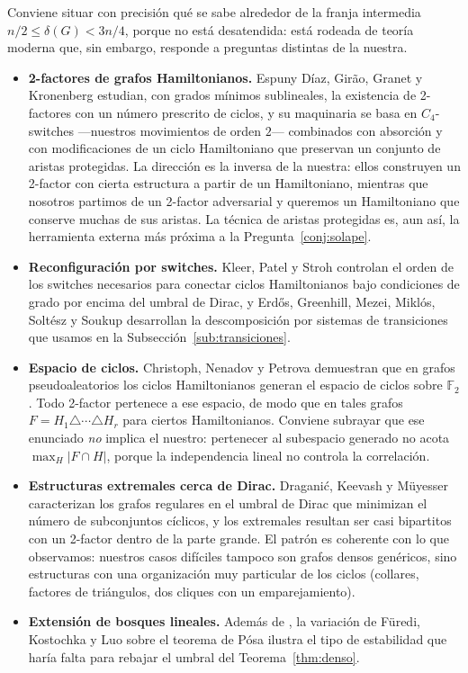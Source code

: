 \documentclass[11pt,a4paper]{article}
\theoremstyle{definition}
\theoremstyle{remark}
\begin{document}
Conviene situar con precisión qué se sabe alrededor de la franja intermedia $n/2\le\delta(G)<3n/4$, porque no está desatendida: está rodeada de teoría moderna que, sin embargo, responde a preguntas distintas de la nuestra.

\begin{itemize}
\item \textbf{2-factores de grafos Hamiltonianos.} Espuny Díaz, Girão, Granet y Kronenberg \cite{twofactors} estudian, con grados mínimos sublineales, la existencia de 2-factores con un número prescrito de ciclos, y su maquinaria se basa en $C_4$-switches —nuestros movimientos de orden $2$— combinados con absorción y con modificaciones de un ciclo Hamiltoniano que preservan un conjunto de aristas protegidas. La dirección es la inversa de la nuestra: ellos construyen un 2-factor con cierta estructura a partir de un Hamiltoniano, mientras que nosotros partimos de un 2-factor adversarial y queremos un Hamiltoniano que conserve muchas de sus aristas. La técnica de aristas protegidas es, aun así, la herramienta externa más próxima a la Pregunta~\ref{conj:solape}.

\item \textbf{Reconfiguración por switches.} Kleer, Patel y Stroh \cite{kps} controlan el orden de los switches necesarios para conectar ciclos Hamiltonianos bajo condiciones de grado por encima del umbral de Dirac, y Erdős, Greenhill, Mezei, Miklós, Soltész y Soukup \cite{egm21} desarrollan la descomposición por sistemas de transiciones que usamos en la Subsección~\ref{sub:transiciones}.

\item \textbf{Espacio de ciclos.} Christoph, Nenadov y Petrova \cite{cnp} demuestran que en grafos pseudoaleatorios los ciclos Hamiltonianos generan el espacio de ciclos sobre $\mathbb{F}_2$. Todo 2-factor pertenece a ese espacio, de modo que en tales grafos $F=H_1\triangle\cdots\triangle H_r$ para ciertos Hamiltonianos. Conviene subrayar que ese enunciado \emph{no} implica el nuestro: pertenecer al subespacio generado no acota $\max_H|F\cap H|$, porque la independencia lineal no controla la correlación.

\item \textbf{Estructuras extremales cerca de Dirac.} Draganić, Keevash y Müyesser \cite{dkm} caracterizan los grafos regulares en el umbral de Dirac que minimizan el número de subconjuntos cíclicos, y los extremales resultan ser casi bipartitos con un 2-factor dentro de la parte grande. El patrón es coherente con lo que observamos: nuestros casos difíciles tampoco son grafos densos genéricos, sino estructuras con una organización muy particular de los ciclos (collares, factores de triángulos, dos cliques con un emparejamiento).

\item \textbf{Extensión de bosques lineales.} Además de \cite{posa64,fgj09,cfgjlp04}, la variación de Füredi, Kostochka y Luo \cite{fkl19} sobre el teorema de Pósa ilustra el tipo de estabilidad que haría falta para rebajar el umbral del Teorema~\ref{thm:denso}.
\end{itemize}
\end{document}
